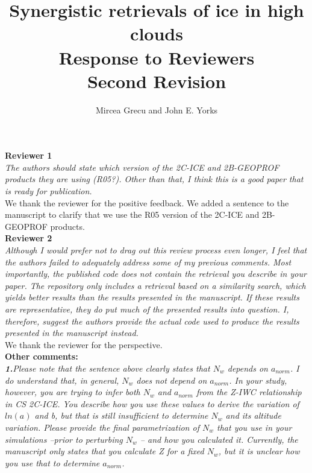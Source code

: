 \documentclass[12pt]{article}
\author{Mircea Grecu and John E. Yorks}
\title{Synergistic retrievals of ice in high clouds\\
Response to Reviewers\\Second Revision}
\date{}
\begin{document}
\maketitle

\noindent \textbf{Reviewer 1}\\

\noindent\textit{The authors should state which version of the 2C-ICE and 2B-GEOPROF products they are using (R05?). Other than that, I think this is a good paper that is 
ready for publication.}\\

\noindent We thank the reviewer for the positive feedback. We added a sentence to the manuscript to clarify that we use the R05 version of the 2C-ICE and 2B-GEOPROF products.\\

\noindent \textbf{Reviewer 2}\\

\noindent\textit{Although I would prefer not to drag out this review process even longer, I feel that the authors failed to adequately address some of my previous comments. Most importantly, the published code does not contain the retrieval you describe in your paper. The repository only includes a retrieval based on a similarity search, which yields better results than the results presented in the manuscript. If these results are representative, they do put much of the presented results into question. I, therefore, suggest the authors provide the actual code used to produce the results presented in the manuscript instead.}\\

\noindent We thank the reviewer for the perspective.\\

\noindent \textbf{Other comments:}\\

\noindent\textit{\textbf{1.}Please note that the sentence above clearly states that $N_w$ depends on $a_{norm}$. I do understand that, in general, $N_w$ does not depend on $a_{norm}$. In your study, however, you are trying to infer both $N_w$ and $a_{norm}$ from the Z-IWC relationship in CS 2C-ICE. You describe how you use these values to derive the variation of $ln(a)$ and b, but that is still insufficient to determine $N_w$ and its altitude variation. Please provide the final parametrization of $N_w$ that you use in your simulations --prior to perturbing $N_w$ -- and how you calculated it. Currently, the manuscript only states that you calculate  Z for a fixed $N_w$, but it is unclear how you use that to determine $a_{norm}$.}\\
\end{document}
